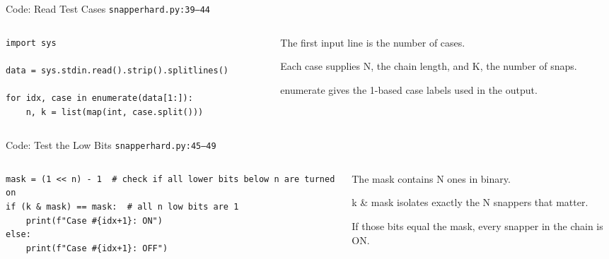 \documentclass[aspectratio=169,11pt]{beamer}
\begin{document}
\begin{frame}[fragile]{Code: Read Test Cases}
\scriptsize
{} \texttt{snapperhard.py:39--44}

\vspace{0.08cm}
\begin{columns}[T,totalwidth=\textwidth]
\begin{column}{0.58\textwidth}
\begin{lstlisting}[style=cpcode]
import sys

data = sys.stdin.read().strip().splitlines()

for idx, case in enumerate(data[1:]):
    n, k = list(map(int, case.split()))
\end{lstlisting}
\end{column}
\begin{column}{0.38\textwidth}
\begin{tightitemize}
  \item The first input line is the number of cases.
  \item Each case supplies N, the chain length, and K, the number of snaps.
  \item enumerate gives the 1-based case labels used in the output.
\end{tightitemize}
\end{column}
\end{columns}
\end{frame}

\begin{frame}[fragile]{Code: Test the Low Bits}
\scriptsize
{} \texttt{snapperhard.py:45--49}

\vspace{0.08cm}
\begin{columns}[T,totalwidth=\textwidth]
\begin{column}{0.58\textwidth}
\begin{lstlisting}[style=cpcode]
mask = (1 << n) - 1  # check if all lower bits below n are turned on
if (k & mask) == mask:  # all n low bits are 1
    print(f"Case #{idx+1}: ON")
else:
    print(f"Case #{idx+1}: OFF")
\end{lstlisting}
\end{column}
\begin{column}{0.38\textwidth}
\begin{tightitemize}
  \item The mask contains N ones in binary.
  \item k \& mask isolates exactly the N snappers that matter.
  \item If those bits equal the mask, every snapper in the chain is ON.
\end{tightitemize}
\end{column}
\end{columns}
\end{frame}
\end{document}
